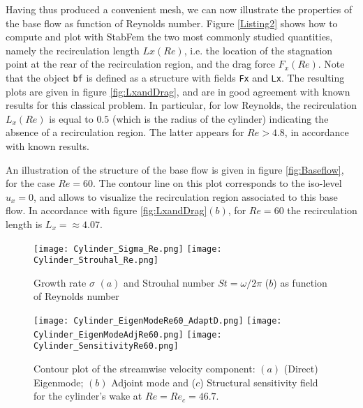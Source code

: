 \documentclass[twocolumn,10pt]{asme2ej}
\begin{document}
Having thus produced a convenient mesh, we can now illustrate the properties of the base flow as function of Reynolds number. Figure \ref{Listing2} shows how to compute and plot with StabFem the two most commonly studied quantities, namely the recirculation length $Lx(Re)$, i.e. the location of the stagnation point at the rear of the recirculation region, and the drag force $F_x(Re)$.
Note that the object \verb|bf| is defined as a structure with fields \verb|Fx| and \verb|Lx|. 
The resulting plots are given in figure \ref{fig:LxandDrag}, and are in good agreement with known results for this classical problem.
In particular, for low Reynolds, the recirculation $L_x(Re)$ is equal to $0.5$ (which is the radius of the cylinder) indicating the absence of a recirculation region. The latter appears for $Re > 4.8$, in accordance with known results.

An illustration of the structure of the base flow is given in figure \ref{fig:Baseflow},  for the case $Re = 60$. The contour line on this plot corresponds to the iso-level $u_x = 0$, and allows to visualize the recirculation region associated to this base flow. In accordance with figure \ref{fig:LxandDrag}$(b)$, for $Re = 60$ the recirculation length is $L_x = \approx 4.07$.









\begin{figure}
\texttt{[image: Cylinder\_Sigma\_Re.png]}
\texttt{[image: Cylinder\_Strouhal\_Re.png]}
\caption{Growth rate $\sigma$ $(a)$  and Strouhal number $St = \omega/2\pi$ ($b$) as function of Reynolds number}
\label{fig:SigmaOmega}
\end{figure}

\begin{figure}
\texttt{[image: Cylinder\_EigenModeRe60\_AdaptD.png]}
\texttt{[image: Cylinder\_EigenModeAdjRe60.png]}
\texttt{[image: Cylinder\_SensitivityRe60.png]}
\caption{Contour plot of the streamwise velocity component: $(a)$ (Direct) Eigenmode; $(b)$ Adjoint mode and ($c$) Structural sensitivity field for the cylinder's wake at $Re=Re_c = 46.7$.}
\label{fig:Eigenmode}
\end{figure}
\end{document}
